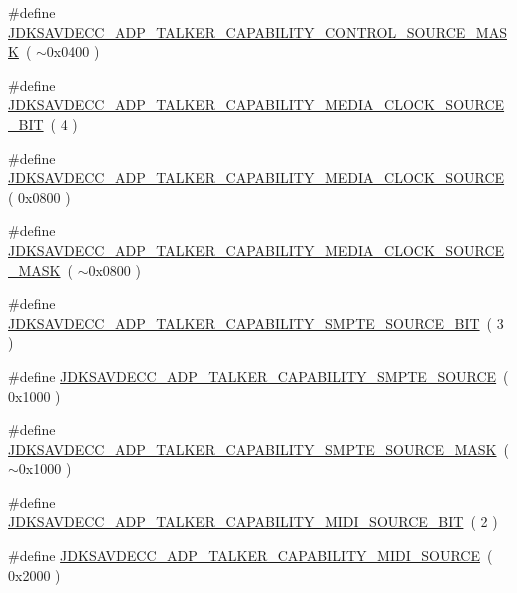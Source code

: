 \begin{DoxyCompactItemize}
\item 
\#define \hyperlink{group__talker__capability_gafde611d00067fb60aa4e7be72131bcf6}{J\+D\+K\+S\+A\+V\+D\+E\+C\+C\+\_\+\+A\+D\+P\+\_\+\+T\+A\+L\+K\+E\+R\+\_\+\+C\+A\+P\+A\+B\+I\+L\+I\+T\+Y\+\_\+\+C\+O\+N\+T\+R\+O\+L\+\_\+\+S\+O\+U\+R\+C\+E\+\_\+\+M\+A\+SK}~( $\sim$0x0400 )
\item 
\#define \hyperlink{group__talker__capability_gaa89f2638cc4f0263cd1923ffa391aa0f}{J\+D\+K\+S\+A\+V\+D\+E\+C\+C\+\_\+\+A\+D\+P\+\_\+\+T\+A\+L\+K\+E\+R\+\_\+\+C\+A\+P\+A\+B\+I\+L\+I\+T\+Y\+\_\+\+M\+E\+D\+I\+A\+\_\+\+C\+L\+O\+C\+K\+\_\+\+S\+O\+U\+R\+C\+E\+\_\+\+B\+IT}~( 4 )
\item 
\#define \hyperlink{group__talker__capability_ga36588c23eb312aae8e9762b4c936aa40}{J\+D\+K\+S\+A\+V\+D\+E\+C\+C\+\_\+\+A\+D\+P\+\_\+\+T\+A\+L\+K\+E\+R\+\_\+\+C\+A\+P\+A\+B\+I\+L\+I\+T\+Y\+\_\+\+M\+E\+D\+I\+A\+\_\+\+C\+L\+O\+C\+K\+\_\+\+S\+O\+U\+R\+CE}~( 0x0800 )
\item 
\#define \hyperlink{group__talker__capability_ga2acef4bc04f728ebfe4e705a1f7cf38f}{J\+D\+K\+S\+A\+V\+D\+E\+C\+C\+\_\+\+A\+D\+P\+\_\+\+T\+A\+L\+K\+E\+R\+\_\+\+C\+A\+P\+A\+B\+I\+L\+I\+T\+Y\+\_\+\+M\+E\+D\+I\+A\+\_\+\+C\+L\+O\+C\+K\+\_\+\+S\+O\+U\+R\+C\+E\+\_\+\+M\+A\+SK}~( $\sim$0x0800 )
\item 
\#define \hyperlink{group__talker__capability_ga2d5a9d355c986d4f542e0b278c7acfa5}{J\+D\+K\+S\+A\+V\+D\+E\+C\+C\+\_\+\+A\+D\+P\+\_\+\+T\+A\+L\+K\+E\+R\+\_\+\+C\+A\+P\+A\+B\+I\+L\+I\+T\+Y\+\_\+\+S\+M\+P\+T\+E\+\_\+\+S\+O\+U\+R\+C\+E\+\_\+\+B\+IT}~( 3 )
\item 
\#define \hyperlink{group__talker__capability_ga5e5ce0b1c2006e81740e3abfbb112356}{J\+D\+K\+S\+A\+V\+D\+E\+C\+C\+\_\+\+A\+D\+P\+\_\+\+T\+A\+L\+K\+E\+R\+\_\+\+C\+A\+P\+A\+B\+I\+L\+I\+T\+Y\+\_\+\+S\+M\+P\+T\+E\+\_\+\+S\+O\+U\+R\+CE}~( 0x1000 )
\item 
\#define \hyperlink{group__talker__capability_gab5852431d286188b382a9967a6fdb006}{J\+D\+K\+S\+A\+V\+D\+E\+C\+C\+\_\+\+A\+D\+P\+\_\+\+T\+A\+L\+K\+E\+R\+\_\+\+C\+A\+P\+A\+B\+I\+L\+I\+T\+Y\+\_\+\+S\+M\+P\+T\+E\+\_\+\+S\+O\+U\+R\+C\+E\+\_\+\+M\+A\+SK}~( $\sim$0x1000 )
\item 
\#define \hyperlink{group__talker__capability_gaebbf4ef0d49a70690cc21bc291ccbb5d}{J\+D\+K\+S\+A\+V\+D\+E\+C\+C\+\_\+\+A\+D\+P\+\_\+\+T\+A\+L\+K\+E\+R\+\_\+\+C\+A\+P\+A\+B\+I\+L\+I\+T\+Y\+\_\+\+M\+I\+D\+I\+\_\+\+S\+O\+U\+R\+C\+E\+\_\+\+B\+IT}~( 2 )
\item 
\#define \hyperlink{group__talker__capability_ga6821d8ee1c90b49e3c01af21104021c9}{J\+D\+K\+S\+A\+V\+D\+E\+C\+C\+\_\+\+A\+D\+P\+\_\+\+T\+A\+L\+K\+E\+R\+\_\+\+C\+A\+P\+A\+B\+I\+L\+I\+T\+Y\+\_\+\+M\+I\+D\+I\+\_\+\+S\+O\+U\+R\+CE}~( 0x2000 )

\end{DoxyCompactItemize}

